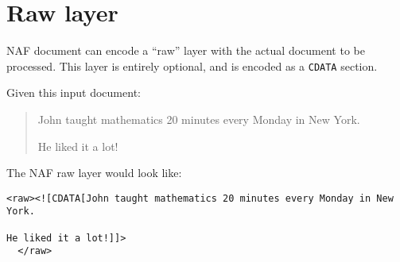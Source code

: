 
\section{Raw layer}
\label{sec:raw-layer}

NAF document can encode a ``raw'' layer with the actual document to be
processed. This layer is entirely optional, and is encoded as a
\texttt{CDATA} section.

Given this input document:
\begin{quote}
  John taught mathematics 20 minutes every Monday in New York.

  He liked it a lot!
\end{quote}

The NAF raw layer would look like:
\begin{Verbatim}[fontsize=\small]
  <raw><![CDATA[John taught mathematics 20 minutes every Monday in New York.

He liked it a lot!]]>
  </raw>
\end{Verbatim}


